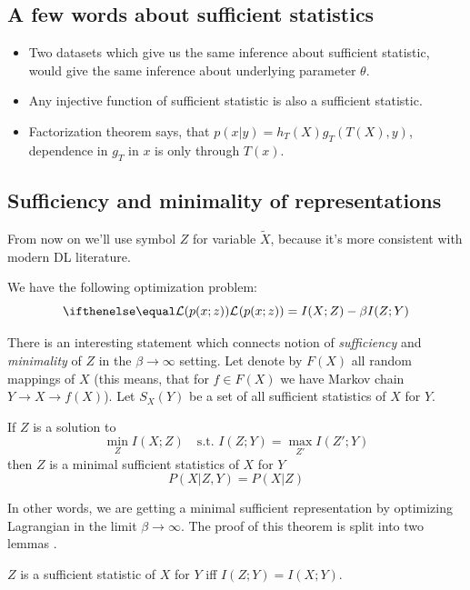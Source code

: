 \documentclass{article}
\begin{document}
\subsection{A few words about sufficient statistics}
\begin{itemize}
    \item Two datasets which give us the same inference about sufficient statistic, would give the same inference about underlying parameter $\theta$.
    \item Any injective function of sufficient statistic is also a sufficient statistic.
    \item Factorization theorem says, that $p(x|y) = h_T(X) g_T(T(X), y)$, dependence in $g_T$ in $x$ is only through $T(x)$.
\end{itemize}

\subsection{Sufficiency and minimality of representations}
From now on we'll use symbol $Z$ for variable $\tilde{X}$, because it's more consistent with modern DL literature.

We have the following optimization problem:
\[
\loss{p(x;z)} = I(X;Z) - \beta I(Z; Y)
\]

There is an interesting statement which connects notion of \textit{sufficiency} and \textit{minimality} of $Z$ in the $\beta \to \infty$ setting.
Let denote by $F(X)$ all random mappings of $X$ (this means, that for $f \in F(X)$ we have Markov chain $Y \to X \to f(X)$).
Let $S_X(Y)$ be a set of all sufficient statistics of $X$ for $Y$.

\begin{proposition}
If $Z$ is a solution to
\[
\min_{Z} I(X; Z) \quad\text{s.t. } I(Z;Y) = \max_{Z'} I(Z'; Y)
\]
then $Z$ is a minimal sufficient statistics of $X$ for $Y$
\[
P(X|Z,Y) = P(X|Z)
\]
\end{proposition}

In other words, we are getting a minimal sufficient representation by optimizing Lagrangian in the limit $\beta \to \infty$.
The proof of this theorem is split into two lemmas \cite{IB_learning_and_generalization}.

\begin{lemma}
    $Z$ is a sufficient statistic of $X$ for $Y$ iff $I(Z;Y) = I(X;Y)$.
\end{lemma}
\end{document}
